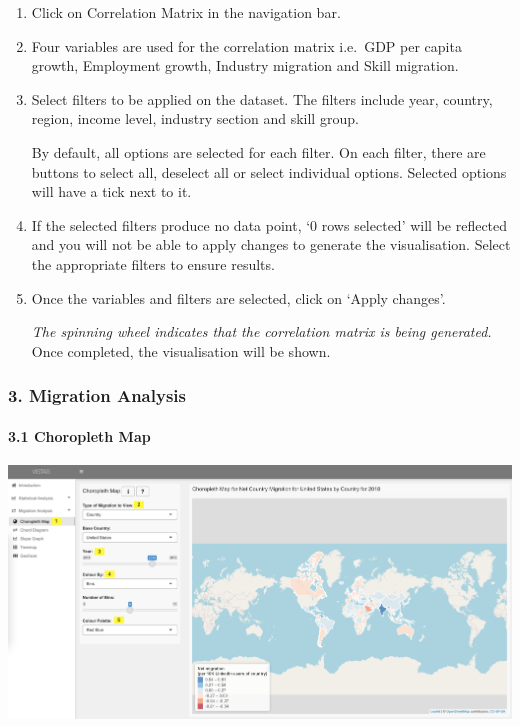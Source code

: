 \documentclass[
]{article}
\begin{document}
\begin{enumerate}
\def\labelenumi{\arabic{enumi}.}
\item
  Click on Correlation Matrix in the navigation bar.
\item
  Four variables are used for the correlation matrix i.e.~GDP per capita
  growth, Employment growth, Industry migration and Skill migration.
\item
  Select filters to be applied on the dataset. The filters include year,
  country, region, income level, industry section and skill group.

  By default, all options are selected for each filter. On each filter,
  there are buttons to select all, deselect all or select individual
  options. Selected options will have a tick next to it.
\item
  If the selected filters produce no data point, `0 rows selected' will
  be reflected and you will not be able to apply changes to generate the
  visualisation. Select the appropriate filters to ensure results.
\item
  Once the variables and filters are selected, click on `Apply changes'.

  \emph{The spinning wheel indicates that the correlation matrix is
  being generated.} Once completed, the visualisation will be shown.
\end{enumerate}

\hypertarget{migration-analysis}{%
\subsubsection{3. Migration Analysis}\label{migration-analysis}}

\hypertarget{choropleth-map}{%
\paragraph{3.1 Choropleth Map}\label{choropleth-map}}

\includegraphics{images/10-choropleth.png}
\end{document}
